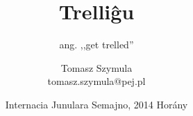 \documentclass{beamer}
\title{Trelliĝu}
\subtitle{ang. ,,get trelled''}
\author{Tomasz Szymula \\ tomasz.szymula@pej.pl}
\institute[PEJ]{\texttt{[image: bildoj/pej]}}
\date[IJS 2014]{Internacia Junulara Semajno, 2014 Horány}
\begin{document}
  \frame{\titlepage}
 











  
\end{document}
